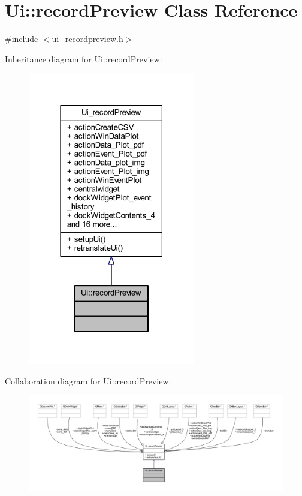 \hypertarget{a00021}{\section{Ui\+:\+:record\+Preview Class Reference}
\label{a00021}
}


{\ttfamily \#include $<$ui\+\_\+recordpreview.\+h$>$}



Inheritance diagram for Ui\+:\+:record\+Preview\+:
\nopagebreak
\begin{figure}[H]
\begin{center}
\leavevmode
\includegraphics[width=207pt]{dd/d4e/a00329}
\end{center}
\end{figure}


Collaboration diagram for Ui\+:\+:record\+Preview\+:
\nopagebreak
\begin{figure}[H]
\begin{center}
\leavevmode
\includegraphics[width=350pt]{dd/dbb/a00330}
\end{center}
\end{figure}
